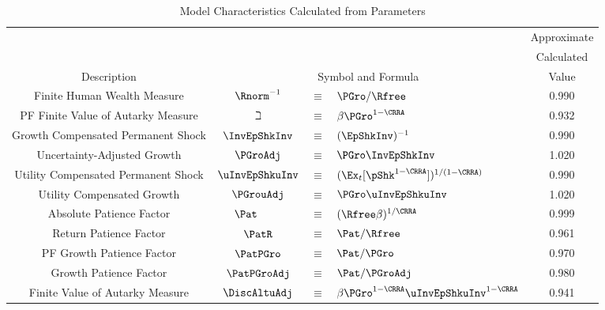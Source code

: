 \begin{table}
\begin{center}\renewcommand{\arraystretch}{1.5}
\caption{Model Characteristics Calculated from Parameters}\label{table:Calibration}
\begin{tabular}{|c|ccl|c|}
\hline
                                            & \multicolumn{3}{c|}{}                                      & Approximate \\
                                            & \multicolumn{3}{c|}{}                                       & Calculated \\
Description                                 & \multicolumn{3}{c|}{Symbol and Formula}                       & Value \\ \hline
Finite Human Wealth Measure                 & $\Rnorm^{-1}$ & $\equiv$ & $\PGro/\Rfree$                    & 0.990 \\
PF Finite Value of Autarky Measure& $\beth$ & $\equiv$ & $\beta \PGro^{1-\CRRA}$                    & 0.932 \\
Growth Compensated Permanent Shock            & $\InvEpShkInv $ & $\equiv$ & $ (\EpShkInv)^{-1}$               & 0.990 \\
Uncertainty-Adjusted Growth                 & $\PGroAdj $ & $\equiv$ & $ \PGro \InvEpShkInv$        & 1.020 \\
Utility Compensated Permanent Shock                & $\uInvEpShkuInv $ & $\equiv$ & $ (\Ex_{t}[\pShk^{1-\CRRA}])^{1/(1-\CRRA)}$ & 0.990 \\
Utility Compensated Growth                     & $\PGrouAdj $ & $\equiv$ & $ \PGro \uInvEpShkuInv$        & 1.020 \\
Absolute Patience Factor                    & $\Pat_{\phantom{\Rfree}} $ & $\equiv$ & $ (\Rfree \beta)^{1/\CRRA}$                & 0.999 \\
Return Patience Factor                      & $\PatR$ & $\equiv$ & $\Pat/\Rfree $     & 0.961 \\
PF Growth Patience Factor    & $\PatPGro$ & $\equiv$ & $\Pat/\PGro $      & 0.970 \\
Growth Patience Factor                      & $\PatPGroAdj$ & $\equiv$ & $ \Pat/\PGroAdj$& 0.980 \\
Finite Value of Autarky Measure         & $\DiscAltuAdj $ & $\equiv$ & $ \beta \PGro^{1-\CRRA}\uInvEpShkuInv^{1-\CRRA}$       & 0.941 \\ \hline
\end{tabular}
\end{center}
\end{table}
